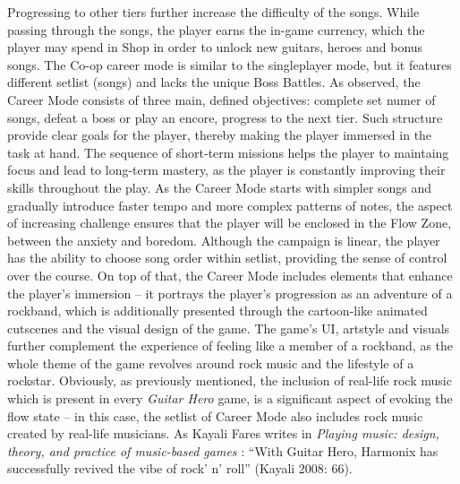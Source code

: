 Progressing to other tiers further increase the difficulty of the songs. While passing through the songs, the player earns the in-game currency, which the player may spend in Shop in order to unlock new guitars, heroes and bonus songs. The Co-op career mode is similar to the singleplayer mode, but it features different setlist (songs) and lacks the unique Boss Battles. As observed, the Career Mode consists of three main, defined objectives: complete set numer of songs, defeat a boss or play an encore, progress to the next tier. Such structure provide clear goals for the player, thereby making the player immersed in the task at hand. The sequence of short-term missions helps the player to maintaing focus and lead to long-term mastery, as the player is constantly improving their skills throughout the play. As the Career Mode starts with simpler songs and gradually introduce faster tempo and more complex patterns of notes, the aspect of increasing challenge ensures that the player will be enclosed in the Flow Zone, between the anxiety and boredom. Although the campaign is linear, the player has the ability to choose song order within setlist, providing the sense of control over the course. On top of that, the Career Mode includes elements that enhance the player’s immersion -- it portrays the player’s progression as an adventure of a rockband, which is additionally presented through the cartoon-like animated cutscenes and the visual design of the game. The game’s UI, artstyle and visuals further complement the experience of feeling like a member of a rockband, as the whole theme of the game revolves around rock music and the lifestyle of a rockstar. Obviously, as previously mentioned, the inclusion of real-life rock music which is present in every \textit{Guitar Hero} game, is a significant aspect of evoking the flow state -- in this case, the setlist of Career Mode also includes rock music created by real-life musicians. As Kayali Fares writes in \textit{Playing music: design, theory, and practice of music-based games} \cite{faresplayingmusic}: “With Guitar Hero, Harmonix has successfully revived the vibe of rock’ n’ roll” (Kayali 2008: 66).

